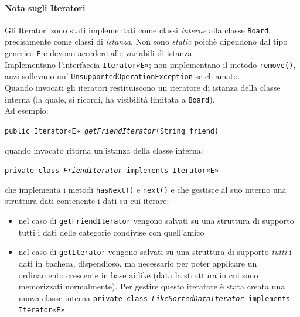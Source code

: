 \documentclass[10pt, a4paper]{article}
\begin{document}
\paragraph{Nota sugli Iteratori} Gli Iteratori sono stati implementati come classi \textit{interne} alla classe \texttt{Board}, precisamente come classi di \textit{istanza}. Non sono \textit{static} poichè dipendono dal tipo generico \texttt{E} e devono accedere alle variabili di istanza.\\ Implementano l'interfaccia \texttt{Iterator«E»}; non implementano il metodo \texttt{remove()}, anzi sollevano un' \texttt{UnsupportedOperationException} se chiamato.\\
Quando invocati gli iteratori restituiscono un iteratore di istanza della classe interna (la quale, si ricordi, ha visibilità limitata a \texttt{Board}). \\
Ad esempio: 
\begin{center}
	\texttt{public Iterator«E» \emph{getFriendIterator}(String friend)}
\end{center}
quando 	invocato ritorna un'istanza della classe interna:
\begin{center}
	\texttt{private class \emph{FriendIterator} implements Iterator«E» }
\end{center}
che implementa i metodi \texttt{hasNext()} e \texttt{next()} e che gestisce al suo interno una struttura dati contenente i dati su cui iterare:
\begin{itemize}
\item nel caso di \texttt{getFriendIterator} vengono salvati su una struttura di supporto tutti i dati delle categorie condivise con quell'amico
\item nel caso di \texttt{getIterator} vengono salvati su una struttura di supporto \textit{tutti} i dati in bacheca, dispendioso, ma necessario per poter applicare un ordinamento crescente in base ai like (data la struttura in cui sono memorizzati normalmente). Per gestire questo iteratore è stata creata una nuova classe interna \texttt{private class \emph{LikeSortedDataIterator} implements Iterator«E»}.
\end{itemize}
\end{document}

